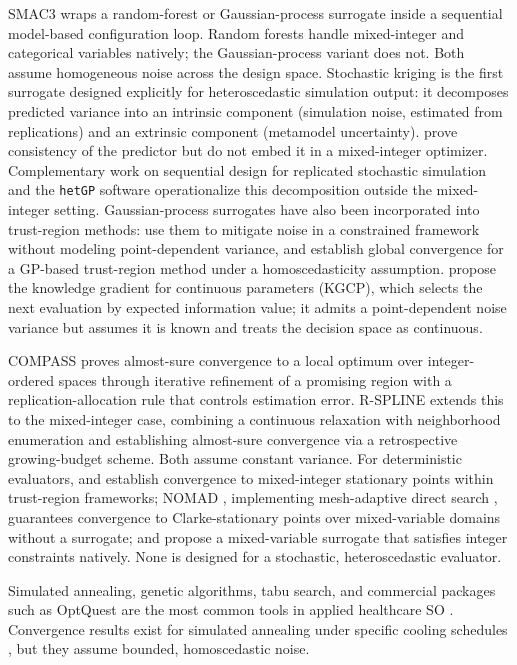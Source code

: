 \documentclass[11pt]{elsarticle}
\begin{document}
SMAC3 \citep{Lindauer2022} wraps a random-forest or Gaussian-process surrogate inside a sequential model-based configuration loop. Random forests handle mixed-integer and categorical variables natively; the Gaussian-process variant does not. Both assume homogeneous noise across the design space. Stochastic kriging \citep{Ankenman2010} is the first surrogate designed explicitly for heteroscedastic simulation output: it decomposes predicted variance into an intrinsic component (simulation noise, estimated from replications) and an extrinsic component (metamodel uncertainty). \citet{Ankenman2010} prove consistency of the predictor but do not embed it in a mixed-integer optimizer. Complementary work on sequential design for replicated stochastic simulation \citep{Binois2019} and the \texttt{hetGP} software \citep{BinoisGramacy2021hetGP,Binois2018} operationalize this decomposition outside the mixed-integer setting. Gaussian-process surrogates have also been incorporated into trust-region methods: \citet{Menhorn2017} use them to mitigate noise in a constrained framework without modeling point-dependent variance, and \citet{Shukla2020} establish global convergence for a GP-based trust-region method under a homoscedasticity assumption. \citet{Scott2011} propose the knowledge gradient for continuous parameters (KGCP), which selects the next evaluation by expected information value; it admits a point-dependent noise variance but assumes it is known and treats the decision space as continuous.

COMPASS \citep{HongNelson2006} proves almost-sure convergence to a local optimum over integer-ordered spaces through iterative refinement of a promising region with a replication-allocation rule that controls estimation error. R-SPLINE \citep{WangRSPLINE2013} extends this to the mixed-integer case, combining a continuous relaxation with neighborhood enumeration and establishing almost-sure convergence via a retrospective growing-budget scheme. Both assume constant variance. For deterministic evaluators, \citet{NewbyAli2015} and \citet{Torres2024MITR} establish convergence to mixed-integer stationary points within trust-region frameworks; NOMAD \citep{LeDigabel2011}, implementing mesh-adaptive direct search \citep{Audet2006}, guarantees convergence to Clarke-stationary points over mixed-variable domains without a surrogate; and \citet{Bliek2021} propose a mixed-variable surrogate that satisfies integer constraints natively. None is designed for a stochastic, heteroscedastic evaluator.

Simulated annealing, genetic algorithms, tabu search, and commercial packages such as OptQuest \citep{Laguna2003} are the most common tools in applied healthcare SO \citep{Wang2023}. Convergence results exist for simulated annealing under specific cooling schedules \citep{Hajek1988,Alrefaei1999}, but they assume bounded, homoscedastic noise.
\end{document}
